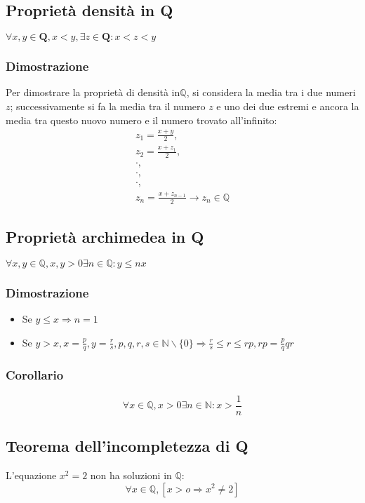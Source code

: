 \subsection{Propriet\`a densit\`a in Q}
$\forall x, y \in \mathbf{Q}, x <y, \exists z \in \mathbf{Q} : x<z<y $ 
\subsubsection*{Dimostrazione}
Per dimostrare la propriet\`a di densit\`a in$\mathbb{Q}$, si considera la media tra i due numeri $z$; successivamente si fa la media tra il numero $z$ e uno dei due estremi
e ancora la media tra questo nuovo numero e il numero trovato all'infinito:
\begin{gather*}
z_1=\frac{x+y}{2},\\
z_2=\frac{x+z_1}{2},\\
\cdot,\\
\cdot,\\
\cdot,\\
z_n=\frac{x+z_{n-1}}{2}\rightarrow z_n\in\mathbb{Q}
\end{gather*}
\subsection{Propriet\`a archimedea in Q}
$\forall x, y \in \mathbb{Q}, x, y>0 \exists n \in \mathbb{Q}:y\le nx$
\subsubsection*{Dimostrazione}
\begin{itemize}
\item Se $y\le x\Rightarrow n=1$
\item Se $y>x, x=\frac{p}{q}, y=\frac{r}{s}, p,q,r,s\in\mathbb{N}\backslash\{0\}\Rightarrow \frac{r}{s}\le r\le rp, rp=\frac{p}{q}qr$
\end{itemize}
\subsubsection{Corollario}
\begin{equation}
\forall x \in \mathbb{Q}, x>0 \exists n \in \mathbb{N}: x>\frac{1}{n}
\end{equation}
\subsection{Teorema dell'incompletezza di Q}
L'equazione $x^2=2$ non ha soluzioni in $\mathbb{Q}$:
\begin{equation}
\forall x \in \mathbb{Q}, [x>o \Rightarrow x^2\ne 2]
\end{equation}
